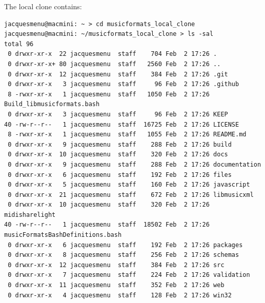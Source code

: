 The local clone contains:
\begin{lstlisting}[language=Terminal]
jacquesmenu@macmini: ~ > cd musicformats_local_clone
jacquesmenu@macmini: ~/musicformats_local_clone > ls -sal
total 96
 0 drwxr-xr-x  22 jacquesmenu  staff    704 Feb  2 17:26 .
 0 drwxr-xr-x+ 80 jacquesmenu  staff   2560 Feb  2 17:26 ..
 0 drwxr-xr-x  12 jacquesmenu  staff    384 Feb  2 17:26 .git
 0 drwxr-xr-x   3 jacquesmenu  staff     96 Feb  2 17:26 .github
 8 -rwxr-xr-x   1 jacquesmenu  staff   1050 Feb  2 17:26 Build_libmusicformats.bash
 0 drwxr-xr-x   3 jacquesmenu  staff     96 Feb  2 17:26 KEEP
40 -rw-r--r--   1 jacquesmenu  staff  16725 Feb  2 17:26 LICENSE
 8 -rwxr-xr-x   1 jacquesmenu  staff   1055 Feb  2 17:26 README.md
 0 drwxr-xr-x   9 jacquesmenu  staff    288 Feb  2 17:26 build
 0 drwxr-xr-x  10 jacquesmenu  staff    320 Feb  2 17:26 docs
 0 drwxr-xr-x   9 jacquesmenu  staff    288 Feb  2 17:26 documentation
 0 drwxr-xr-x   6 jacquesmenu  staff    192 Feb  2 17:26 files
 0 drwxr-xr-x   5 jacquesmenu  staff    160 Feb  2 17:26 javascript
 0 drwxr-xr-x  21 jacquesmenu  staff    672 Feb  2 17:26 libmusicxml
 0 drwxr-xr-x  10 jacquesmenu  staff    320 Feb  2 17:26 midisharelight
40 -rw-r--r--   1 jacquesmenu  staff  18502 Feb  2 17:26 musicFormatsBashDefinitions.bash
 0 drwxr-xr-x   6 jacquesmenu  staff    192 Feb  2 17:26 packages
 0 drwxr-xr-x   8 jacquesmenu  staff    256 Feb  2 17:26 schemas
 0 drwxr-xr-x  12 jacquesmenu  staff    384 Feb  2 17:26 src
 0 drwxr-xr-x   7 jacquesmenu  staff    224 Feb  2 17:26 validation
 0 drwxr-xr-x  11 jacquesmenu  staff    352 Feb  2 17:26 web
 0 drwxr-xr-x   4 jacquesmenu  staff    128 Feb  2 17:26 win32
\end{lstlisting}


%
%
%


